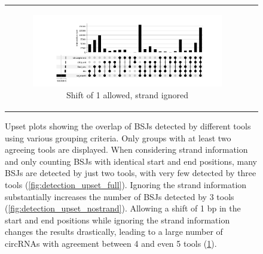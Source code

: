 \begin{figure}[ht]
\begin{tabular}{cc}
{\begin{subfigure}{\textwidth}
                \includegraphics[width=\linewidth]{chapters/4_results_and_discussion/figures/detection/min_samples_0/upset/diff_1_nostrand.png}
                \caption{Shift of 1 allowed, strand ignored}
                \label{fig:detection_upset_microshift}

            \end{subfigure}}
    \end{tabular}
    \caption{Upset plots showing the overlap of BSJs detected by different
        tools using various grouping criteria.
        Only groups with at least two agreeing tools are displayed.
        When considering strand information and only counting BSJs with identical start
        and end positions, many BSJs are detected by just two tools, with very few
        detected by three tools (\cref{fig:detection_upset_full}).
        Ignoring the strand information substantially increases the number of BSJs
        detected by 3 tools (\cref{fig:detection_upset_nostrand}).
        Allowing a shift of 1 bp in the start and end positions while ignoring the
        strand information changes the results drastically, leading to a large number
        of circRNAs with agreement between 4 and even 5 tools
        (\cref{fig:detection_upset_microshift}).
    }
    \label{fig:detection_upset}
\end{figure}

